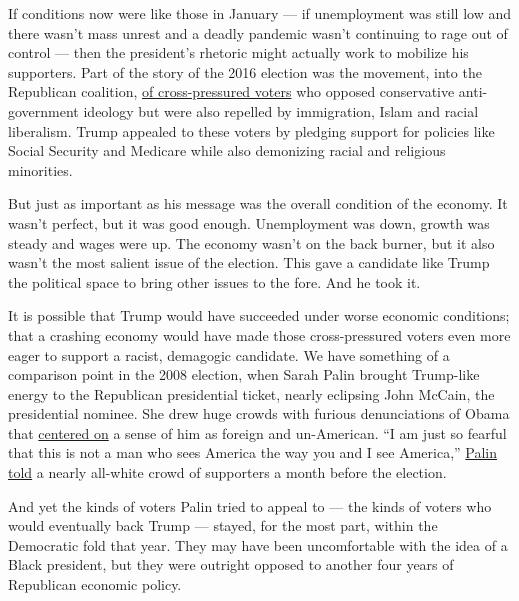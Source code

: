 If conditions now were like those in January --- if unemployment was
still low and there wasn't mass unrest and a deadly pandemic wasn't
continuing to rage out of control --- then the president's rhetoric
might actually work to mobilize his supporters. Part of the story of the
2016 election was the movement, into the Republican coalition,
\href{https://www.nytimes.com/2019/03/29/opinion/sunday/trump-obamacare.html}{of
cross-pressured voters} who opposed conservative anti-government
ideology but were also repelled by immigration, Islam and racial
liberalism. Trump appealed to these voters by pledging support for
policies like Social Security and Medicare while also demonizing racial
and religious minorities.

But just as important as his message was the overall condition of the
economy. It wasn't perfect, but it was good enough. Unemployment was
down, growth was steady and wages were up. The economy wasn't on the
back burner, but it also wasn't the most salient issue of the election.
This gave a candidate like Trump the political space to bring other
issues to the fore. And he took it.

It is possible that Trump would have succeeded under worse economic
conditions; that a crashing economy would have made those
cross-pressured voters even more eager to support a racist, demagogic
candidate. We have something of a comparison point in the 2008 election,
when Sarah Palin brought Trump-like energy to the Republican
presidential ticket, nearly eclipsing John McCain, the presidential
nominee. She drew huge crowds with furious denunciations of Obama that
\href{https://radio.wosu.org/post/how-sarah-palin-paved-way-donald-trump\#stream/0}{centered
on} a sense of him as foreign and un-American. ``I am just so fearful
that this is not a man who sees America the way you and I see America,''
\href{https://books.google.com/books?id=7eKrQrTafusC\&lpg=PA152\&ots=MEzOQJgKyM\&dq=\%22not\%20a\%20man\%20who\%20sees\%20america\%20the\%20way\%20you\%20and\%20i\%20see\%20america\%22\&pg=PA152\#v=onepage\&q=\%22not\%20a\%20man\%20who\%20sees\%20america\%20the\%20way\%20you\%20and\%20i\%20see\%20america\%22\&f=false}{Palin
told} a nearly all-white crowd of supporters a month before the
election.

And yet the kinds of voters Palin tried to appeal to --- the kinds of
voters who would eventually back Trump --- stayed, for the most part,
within the Democratic fold that year. They may have been uncomfortable
with the idea of a Black president, but they were outright opposed to
another four years of Republican economic policy.

